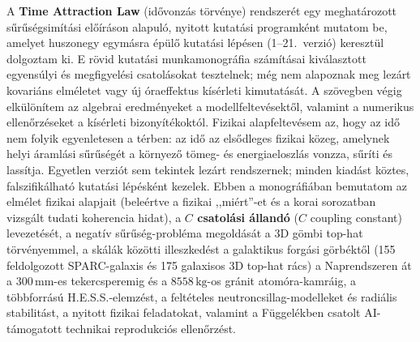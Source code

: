 \documentclass[10pt,a4paper]{article}
\begin{document}
{\small{}\par
A \textbf{Time Attraction Law} (id\H{o}vonz\'as t\"orv\'enye) rendszer\'et egy meghat\'arozott s\H{u}r\H{u}s\'egsim\'it\'asi el\H{o}\'ir\'ason alapul\'o, nyitott kutat\'asi programk\'ent mutatom be, amelyet huszonegy egym\'asra \'ep\"ul\H{o} kutat\'asi l\'ep\'esen (1--21.\ verzi\'o) kereszt\"ul dolgoztam ki. E r\"ovid kutat\'asi munkamonogr\'afia sz\'am\'it\'asai kiv\'alasztott egyens\'ulyi \'es megfigyel\'esi csatol\'asokat tesztelnek; m\'eg nem alapoznak meg lez\'art kovari\'ans elm\'eletet vagy \'uj \'oraeffektus k\'is\'erleti kimutat\'as\'at. A sz\"ovegben v\'egig elk\"ul\"on\'item az algebrai eredm\'enyeket a modellfeltev\'esekt\H{o}l, valamint a numerikus ellen\H{o}rz\'eseket a k\'is\'erleti bizony\'it\'ekokt\'ol. Fizikai alapfeltev\'esem az, hogy az id\H{o} nem folyik egyenletesen a t\'erben: az id\H{o} az els\H{o}dleges fizikai k\"ozeg, amelynek helyi \'araml\'asi s\H{u}r\H{u}s\'eg\'et a k\"ornyez\H{o} t\"omeg- \'es energiaeloszl\'as vonzza, s\H{u}r\'iti \'es lass\'itja. Egyetlen verzi\'ot sem tekintek lez\'art rendszernek; minden kiad\'ast k\"oztes, falszifik\'alhat\'o kutat\'asi l\'ep\'esk\'ent kezelek. Ebben a monogr\'afi\'aban bemutatom az elm\'elet fizikai alapjait (bele\'ertve a fizikai ,,mi\'ert''-et \'es a korai sorozatban vizsg\'alt tudati koherencia hidat), a \textbf{$C$ csatol\'asi \'alland\'o} ($C$ coupling constant) levezet\'es\'et, a negat\'iv s\H{u}r\H{u}s\'eg-probl\'ema megold\'as\'at a 3D g\"ombi top-hat t\"orv\'enyemmel, a sk\'al\'ak k\"oz\"otti illeszked\'est a galaktikus forg\'asi g\"orb\'ekt\H{o}l (155 feldolgozott SPARC-galaxis \'es 175 galaxisos 3D top-hat r\'acs) a Naprendszeren \'at a $300\,\text{mm}$-es tekercsperemig \'es a $8558\,\text{kg}$-os gr\'anit atom\'ora-kamr\'aig, a t\"obbforr\'as\'u H.E.S.S.-elemz\'est, a felt\'eteles neutroncsillag-modelleket \'es radi\'alis stabilit\'ast, a nyitott fizikai feladatokat, valamint a F\"uggel\'ekben csatolt AI-t\'amogatott technikai reprodukci\'os ellen\H{o}rz\'est.

}
\end{document}
